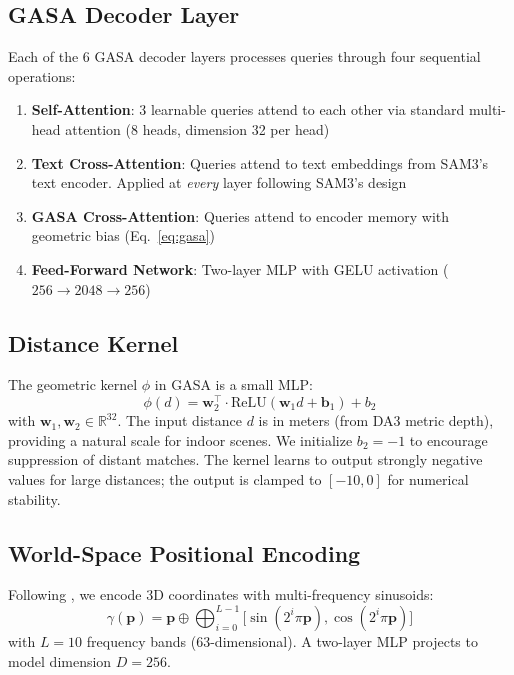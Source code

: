 \label{app:architecture}
\subsection{GASA Decoder Layer}

Each of the 6 GASA decoder layers processes queries through four sequential operations:

\begin{enumerate}[nosep,leftmargin=*]
    \item \textbf{Self-Attention}: 3 learnable queries attend to each other via standard multi-head attention (8 heads, dimension 32 per head)
    \item \textbf{Text Cross-Attention}: Queries attend to text embeddings from SAM3's text encoder. Applied at \emph{every} layer following SAM3's design
    \item \textbf{GASA Cross-Attention}: Queries attend to encoder memory with geometric bias (Eq.~\cref{eq:gasa})
    \item \textbf{Feed-Forward Network}: Two-layer MLP with GELU activation ($256 \to 2048 \to 256$)
\end{enumerate}


\subsection{Distance Kernel}

The geometric kernel $\phi$ in GASA is a small MLP:
\begin{equation}
\phi(d) = \mathbf{w}_2^\top \cdot \text{ReLU}(\mathbf{w}_1 d + \mathbf{b}_1) + b_2
\end{equation}
with $\mathbf{w}_1, \mathbf{w}_2 \in \mathbb{R}^{32}$. The input distance $d$ is in meters (from DA3 metric depth), providing a natural scale for indoor scenes. We initialize $b_2 = -1$ to encourage suppression of distant matches. The kernel learns to output strongly negative values for large distances; the output is clamped to $[-10, 0]$ for numerical stability.

\subsection{World-Space Positional Encoding}

Following \cite{nerf}, we encode 3D coordinates with multi-frequency sinusoids:
\begin{equation}
\gamma(\mathbf{p}) = \mathbf{p} \oplus \bigoplus_{i=0}^{L-1} \big[ \sin(2^i\pi\mathbf{p}), \cos(2^i\pi\mathbf{p}) \big]
\end{equation}
with $L=10$ frequency bands (63-dimensional). A two-layer MLP projects to model dimension $D=256$.


